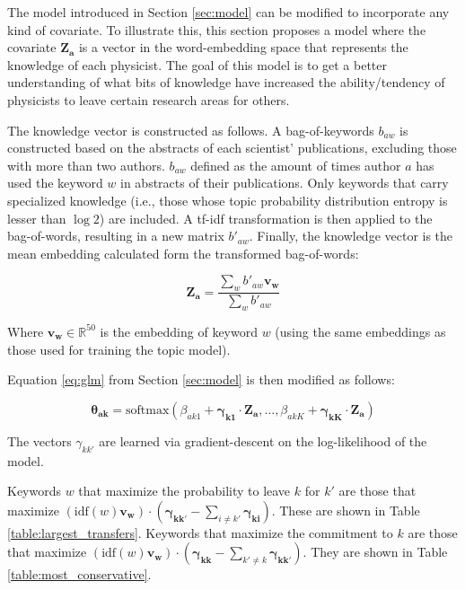 \documentclass{article}
\begin{document}
The model introduced in Section \ref{sec:model} can be modified to incorporate any kind of covariate. To illustrate this, this section proposes a model where the covariate $\bm{Z_a}$ is a vector in the word-embedding space that represents the knowledge of each physicist. The goal of this model is to get a better understanding of what bits of knowledge have increased the ability/tendency of physicists to leave certain research areas for others. 

The knowledge vector is constructed as follows. A bag-of-keywords $b_{aw}$ is constructed based on the abstracts of each scientist' publications, excluding those with more than two authors. $b_{aw}$ defined as the amount of times author $a$ has used the keyword $w$ in abstracts of their publications. Only keywords that carry specialized knowledge (i.e., those whose topic probability distribution entropy is lesser than $\log 2$) are included. A tf-idf transformation is then applied to the bag-of-words, resulting in a new matrix $b'_{aw}$. Finally, the knowledge vector is the mean embedding calculated form the transformed bag-of-words:

\begin{equation}
    \bm{Z_{a}} = \dfrac{\sum_w b'_{aw} \bm{v_{w}}}{\sum_w b'_{aw}} 
\end{equation}

Where $\bm{v_w}\in\mathbb{R}^{50}$ is the embedding of keyword $w$ (using the same embeddings as those used for training the topic model). 

Equation \eqref{eq:glm} from Section \ref{sec:model} is then modified as follows:

\begin{equation}
    \bm{\theta_{ak}} = \text{softmax}\left(\beta_{ak1} + \bm{\gamma_{k1}}\cdot \bm{Z_{a}}, \dots,\beta_{akK} +  \bm{\gamma_{kK}}\cdot \bm{Z_{a}} \right)
\end{equation}

The vectors $\gamma_{kk'}$ are learned via gradient-descent on the log-likelihood of the model.

Keywords $w$ that maximize the probability to leave $k$ for $k'$ are those that maximize $(\text{idf}(w) \bm{v_w}) \cdot (\bm{\gamma_{kk'}}-\sum_{i \neq k'}\bm{\gamma_{ki}})$. These are shown in Table \ref{table:largest_transfers}.
Keywords that maximize the commitment to $k$ are those that maximize $ (\text{idf}(w) \bm{v_w}) \cdot (\bm{\gamma_{kk}}-\sum_{k' \neq k}\bm{\gamma_{kk'}})$. They are shown in Table \ref{table:most_conservative}.

\fontsize{6}{7}\selectfont\normalsize
\fontsize{6}{7}\selectfont\normalsize




\end{document}

